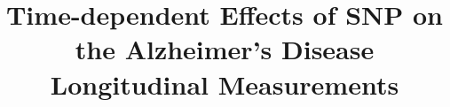 \documentclass[11pt]{report}
\begin{document}
\title{Time-dependent Effects of SNP on the Alzheimer's Disease Longitudinal Measurements}





\firstpage




\figurespagetrue
\tablespagetrue
\end{document}
